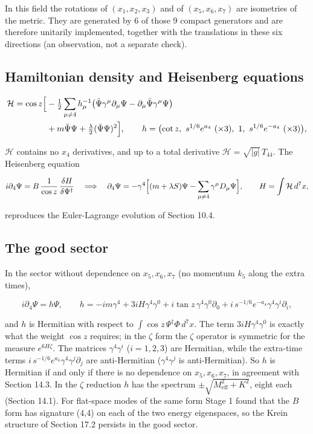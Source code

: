 \documentclass[11pt]{article}
\begin{document}
In this field the rotations of $(x_1,x_2,x_3)$ and of $(x_5,x_6,x_7)$ are isometries of the metric. They are generated by 6 of those 9 compact generators and are therefore unitarily implemented, together with the translations in these six directions (an observation, not a separate check).

\subsection{Hamiltonian density and Heisenberg equations}

\[
\begin{aligned}
\mathcal H=\cos z\Bigl[&-\tfrac12\sum_{\mu\ne4}h_\mu^{-1}\bigl(\bar\Psi\gamma^\mu\partial_\mu\Psi-\partial_\mu\bar\Psi\gamma^\mu\Psi\bigr) \\
&+m\bar\Psi\Psi+\tfrac\lambda2(\bar\Psi\Psi)^2\Bigr],\qquad h=\bigl(\cot z,\ s^{1/6}e^{a_4}\ (\times3),\ 1,\ s^{1/6}e^{-a_4}\ (\times3)\bigr),
\end{aligned}
\]

$\mathcal H$ contains no $x_4$ derivatives, and up to a total derivative $\mathcal H=\sqrt{|g|}\,T_{44}$. The Heisenberg equation

\[
i\partial_4\Psi=B\,\frac{1}{\cos z}\,\frac{\delta H}{\delta\Psi^\dagger}\quad\Longrightarrow\quad \partial_4\Psi=-\gamma^4\Bigl[(m+\lambda S)\Psi-\sum_{\mu\ne4}\gamma^\mu D_\mu\Psi\Bigr],\qquad H=\int\mathcal H\,d^7x ,
\]

reproduces the Euler-Lagrange evolution of Section 10.4.

\subsection{The good sector}

In the sector without dependence on $x_5,x_6,x_7$ (no momentum $k_5$ along the extra times),

\[
i\partial_4\Psi=h\Psi,\qquad h=-im\gamma^4+3iH\gamma^4\gamma^0+i\tan z\,\gamma^4\gamma^0\partial_0+i\,s^{-1/6}e^{-a_4}\gamma^4\gamma^i\partial_i ,
\]

and $h$ is Hermitian with respect to $\int\cos z\,\Psi^\dagger\Phi\,d^7x$. The term $3iH\gamma^4\gamma^0$ is exactly what the weight $\cos z$ requires; in the $\zeta$ form the $\zeta$ operator is symmetric for the measure $e^{6H\zeta}$. The matrices $\gamma^4\gamma^i$ ($i=1,2,3$) are Hermitian, while the extra-time terms $i\,s^{-1/6}e^{a_4}\gamma^4\gamma^j\partial_j$ are anti-Hermitian ($\gamma^4\gamma^j$ is anti-Hermitian). So $h$ is Hermitian if and only if there is no dependence on $x_5,x_6,x_7$, in agreement with Section 14.3. In the $\zeta$ reduction $h$ has the spectrum $\pm\sqrt{M_{\mathrm{eff}}^2+K^2}$, eight each (Section 14.1). For flat-space modes of the same form Stage 1 found that the $B$ form has signature (4,4) on each of the two energy eigenspaces, so the Krein structure of Section 17.2 persists in the good sector.
\end{document}
